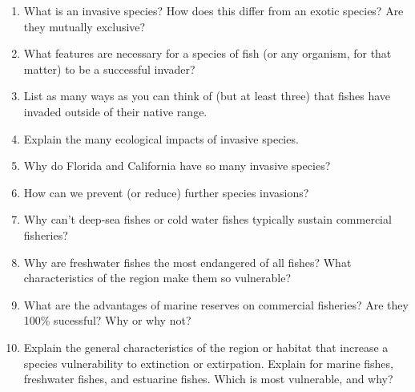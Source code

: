 \documentclass[letterpaper]{tufte-handout}
\begin{document}
\begin{enumerate}
	\item What is an invasive species?  How does this differ from an exotic species? Are they mutually exclusive?
	
	\item What features are necessary for a species of fish (or any organism, for that matter) to be a successful invader?
	
	\item List as many ways as you can think of (but at least three) that fishes have invaded outside of their native range.
	
	\item Explain the many ecological impacts of invasive species.
	
	\item Why do Florida and California have so many invasive species?
	
	\item How can we prevent (or reduce) further species invasions?  
	
	\item Why can’t deep-sea fishes or cold water fishes typically sustain commercial fisheries?
	
	\item Why are freshwater fishes the most endangered of all fishes?  What characteristics of the region make them so vulnerable?
	
	\item What are the advantages of marine reserves on commercial fisheries?  Are they 100\% sucessful? Why or why not?
	
	\item Explain the general characteristics of the region or habitat that increase a species vulnerability to extinction or extirpation.  Explain for marine fishes, freshwater fishes, and estuarine fishes.  Which is most vulnerable, and why?
	
	
\end{enumerate}
\end{document}
